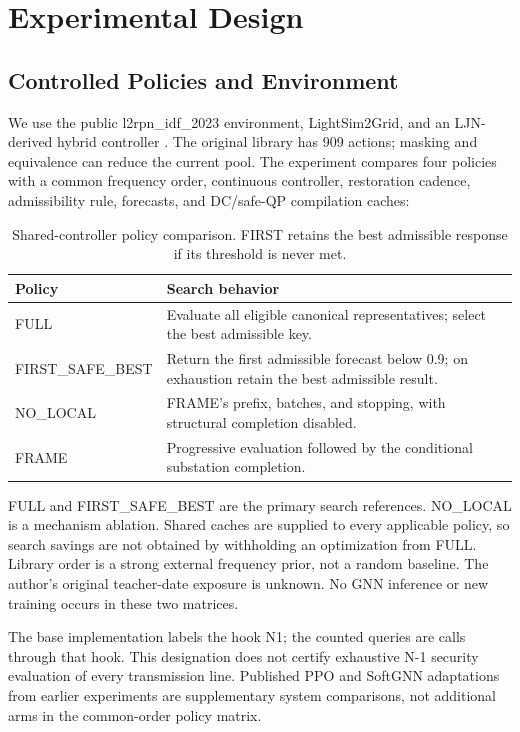 \documentclass[letterpaper]{article}
\begin{document}
\section{Experimental Design}

\subsection{Controlled Policies and Environment}

We use the public l2rpn\_idf\_2023 environment, LightSim2Grid, and an LJN-derived hybrid controller \citep{grid2op,ljn2023agent}. The original library has 909 actions; masking and equivalence can reduce the current pool. The experiment compares four policies with a common frequency order, continuous controller, restoration cadence, admissibility rule, forecasts, and DC/safe-QP compilation caches:


\begin{table}[t]
\centering
\begin{tabular}{@{}p{}p{}@{}}
\toprule
Policy & Search behavior \\
\midrule
FULL & Evaluate all eligible canonical representatives; select the best admissible key. \\
FIRST\_SAFE\_BEST & Return the first admissible forecast below 0.9; on exhaustion retain the best admissible result. \\
NO\_LOCAL & FRAME's prefix, batches, and stopping, with structural completion disabled. \\
FRAME & Progressive evaluation followed by the conditional substation completion. \\
\bottomrule
\end{tabular}
\caption*{Shared-controller policy comparison. FIRST retains the best admissible response if its threshold is never met.}
\end{table}

FULL and FIRST\_SAFE\_BEST are the primary search references. NO\_LOCAL is a mechanism ablation. Shared caches are supplied to every applicable policy, so search savings are not obtained by withholding an optimization from FULL. Library order is a strong external frequency prior, not a random baseline. The author's original teacher-date exposure is unknown. No GNN inference or new training occurs in these two matrices.


The base implementation labels the hook N1; the counted queries are calls through that hook. This designation does not certify exhaustive N-1 security evaluation of every transmission line. Published PPO and SoftGNN adaptations from earlier experiments are supplementary system comparisons, not additional arms in the common-order policy matrix.
\end{document}
